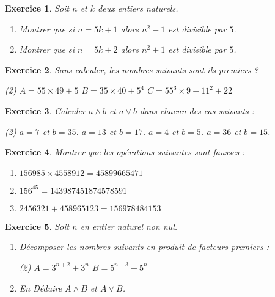 \documentclass[12pt,a4paper]{article}
\theoremstyle{mystyle}
\newtheorem{exo}{Exercice}
\begin{document}
\begin{multicols*}{2}
\begin{exo}
    Soit $n$ et $k$ deux entiers naturels.
    \begin{enumerate}
        \item Montrer que si $n=5k+1$ alors $n^2-1$ est divisible par $5$.
        \item Montrer que si $n=5k+2$ alors $n^2+1$ est divisible par $5$.
    \end{enumerate}
\end{exo}

\begin{exo}
    Sans calculer, les nombres suivants sont-ils premiers ?
    \begin{tasks}(2)
        \task $A = 55\times 49 + 5$
        \task $B = 35 \times 40 + 5^4$
        \task $C = 55^3\times 9 + 11^2 + 22$
    \end{tasks}
\end{exo}

\begin{exo}
    Calculer $a\wedge b$ et $a\vee b$ dans chacun des cas suivants :
    \begin{tasks}(2)
        \task[$\bullet$] $a = 7$ et $b=35$.
        \task[$\bullet$] $a = 13$ et $b = 17$.
        \task[$\bullet$] $a = 4$ et $b = 5$.
        \task[$\bullet$] $a = 36$ et $b = 15$.
    \end{tasks}
\end{exo}
\columnbreak 
\begin{exo}
 Montrer que les opérations suivantes sont fausses :
    \begin{enumerate}
        \item $156985 \times 4558912 = 45899665471$
        \item $156^{45} = 143987451874578591$
        \item $2456321 + 458965123 = 156978484153$
    \end{enumerate}
  
\end{exo}

\begin{exo}
Soit $n$ en entier naturel non nul.
   \begin{enumerate}
        \item Décomposer les nombres suivants en produit de facteurs premiers :
           \begin{tasks}(2)
               \task[$\bullet$] $A = 3^{n+2} + 3^n$
               \task[$\bullet$] $B = 5^{n+3} - 5^n$
           \end{tasks}
        \item En Déduire $A\wedge B$ et $A\vee B$.
   \end{enumerate}
   

\end{exo}
\end{multicols*}
\end{document}
